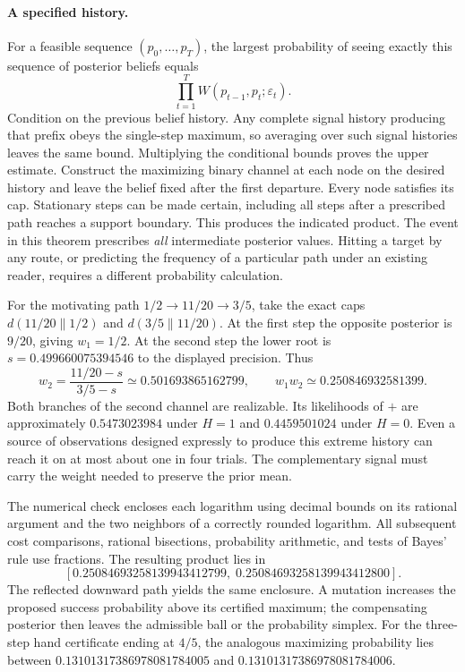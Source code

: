 \documentclass[12pt,letterpaper]{article}
\begin{document}
\paragraph{A specified history.}
For a feasible sequence $(p_0,\ldots,p_T)$, the largest probability of seeing exactly this sequence of posterior beliefs equals
\[
 \prod_{t=1}^T W(p_{t-1},p_t;\varepsilon_t).
\]
Condition on the previous belief history. Any complete signal history producing that prefix obeys the single-step maximum, so averaging over such signal histories leaves the same bound. Multiplying the conditional bounds proves the upper estimate. Construct the maximizing binary channel at each node on the desired history and leave the belief fixed after the first departure. Every node satisfies its cap. Stationary steps can be made certain, including all steps after a prescribed path reaches a support boundary. This produces the indicated product. The event in this theorem prescribes \emph{all} intermediate posterior values. Hitting a target by any route, or predicting the frequency of a particular path under an existing reader, requires a different probability calculation.

For the motivating path $1/2\to 11/20\to3/5$, take the exact caps $d(11/20\|1/2)$ and $d(3/5\|11/20)$. At the first step the opposite posterior is $9/20$, giving $w_1=1/2$. At the second step the lower root is $s=0.499660075394546$ to the displayed precision. Thus
\[
 w_2=\frac{11/20-s}{3/5-s}\simeq0.501693865162799,
 \qquad
 w_1 w_2\simeq 0.250846932581399 .
\]
Both branches of the second channel are realizable. Its likelihoods of $+$ are approximately $0.5473023984$ under $H=1$ and $0.4459501024$ under $H=0$. Even a source of observations designed expressly to produce this extreme history can reach it on at most about one in four trials. The complementary signal must carry the weight needed to preserve the prior mean.

The numerical check encloses each logarithm using decimal bounds on its rational argument and the two neighbors of a correctly rounded logarithm. All subsequent cost comparisons, rational bisections, probability arithmetic, and tests of Bayes' rule use fractions. The resulting product lies in
\[
 [0.25084693258139943412799,\;0.25084693258139943412800].
\]
The reflected downward path yields the same enclosure. A mutation increases the proposed success probability above its certified maximum; the compensating posterior then leaves the admissible ball or the probability simplex. For the three-step hand certificate ending at $4/5$, the analogous maximizing probability lies between $0.13101317386978081784005$ and $0.13101317386978081784006$.
\end{document}
